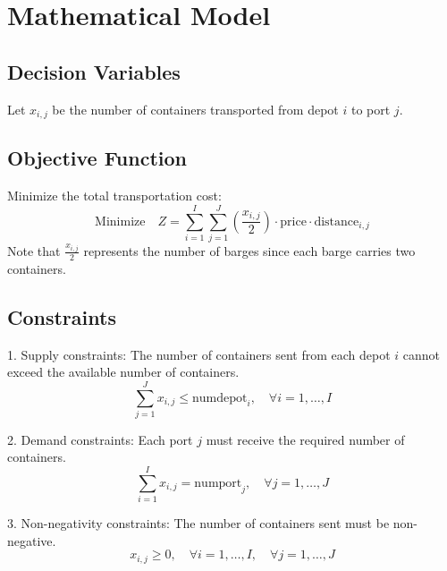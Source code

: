 \documentclass{article}
\begin{document}
\section*{Mathematical Model}

\subsection*{Decision Variables}
Let \( x_{i,j} \) be the number of containers transported from depot \( i \) to port \( j \).

\subsection*{Objective Function}
Minimize the total transportation cost:
\[
\text{Minimize} \quad Z = \sum_{i=1}^{I} \sum_{j=1}^{J} \left( \frac{x_{i,j}}{2} \right) \cdot \text{price} \cdot \text{distance}_{i,j}
\]
Note that \( \frac{x_{i,j}}{2} \) represents the number of barges since each barge carries two containers.

\subsection*{Constraints}

1. Supply constraints: The number of containers sent from each depot \( i \) cannot exceed the available number of containers.
\[
\sum_{j=1}^{J} x_{i,j} \leq \text{numdepot}_i, \quad \forall i = 1, \ldots, I
\]

2. Demand constraints: Each port \( j \) must receive the required number of containers.
\[
\sum_{i=1}^{I} x_{i,j} = \text{numport}_j, \quad \forall j = 1, \ldots, J
\]

3. Non-negativity constraints: The number of containers sent must be non-negative.
\[
x_{i,j} \geq 0, \quad \forall i = 1, \ldots, I, \quad \forall j = 1, \ldots, J
\]
\end{document}
